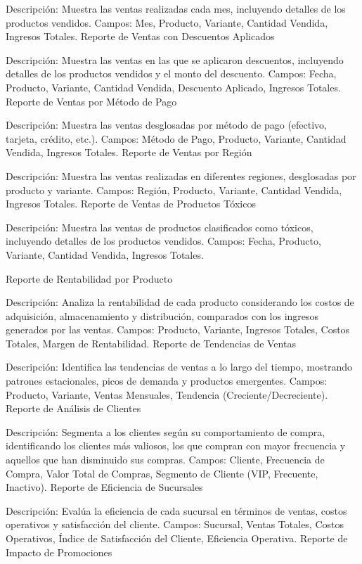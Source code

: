 \documentclass[
  letterpaper,
  DIV=11,
  numbers=noendperiod]{scrreprt}
\begin{document}
Descripción: Muestra las ventas realizadas cada mes, incluyendo detalles
de los productos vendidos. Campos: Mes, Producto, Variante, Cantidad
Vendida, Ingresos Totales. Reporte de Ventas con Descuentos Aplicados

Descripción: Muestra las ventas en las que se aplicaron descuentos,
incluyendo detalles de los productos vendidos y el monto del descuento.
Campos: Fecha, Producto, Variante, Cantidad Vendida, Descuento Aplicado,
Ingresos Totales. Reporte de Ventas por Método de Pago

Descripción: Muestra las ventas desglosadas por método de pago
(efectivo, tarjeta, crédito, etc.). Campos: Método de Pago, Producto,
Variante, Cantidad Vendida, Ingresos Totales. Reporte de Ventas por
Región

Descripción: Muestra las ventas realizadas en diferentes regiones,
desglosadas por producto y variante. Campos: Región, Producto, Variante,
Cantidad Vendida, Ingresos Totales. Reporte de Ventas de Productos
Tóxicos

Descripción: Muestra las ventas de productos clasificados como tóxicos,
incluyendo detalles de los productos vendidos. Campos: Fecha, Producto,
Variante, Cantidad Vendida, Ingresos Totales.

Reporte de Rentabilidad por Producto

Descripción: Analiza la rentabilidad de cada producto considerando los
costos de adquisición, almacenamiento y distribución, comparados con los
ingresos generados por las ventas. Campos: Producto, Variante, Ingresos
Totales, Costos Totales, Margen de Rentabilidad. Reporte de Tendencias
de Ventas

Descripción: Identifica las tendencias de ventas a lo largo del tiempo,
mostrando patrones estacionales, picos de demanda y productos
emergentes. Campos: Producto, Variante, Ventas Mensuales, Tendencia
(Creciente/Decreciente). Reporte de Análisis de Clientes

Descripción: Segmenta a los clientes según su comportamiento de compra,
identificando los clientes más valiosos, los que compran con mayor
frecuencia y aquellos que han disminuido sus compras. Campos: Cliente,
Frecuencia de Compra, Valor Total de Compras, Segmento de Cliente (VIP,
Frecuente, Inactivo). Reporte de Eficiencia de Sucursales

Descripción: Evalúa la eficiencia de cada sucursal en términos de
ventas, costos operativos y satisfacción del cliente. Campos: Sucursal,
Ventas Totales, Costos Operativos, Índice de Satisfacción del Cliente,
Eficiencia Operativa. Reporte de Impacto de Promociones
\end{document}
